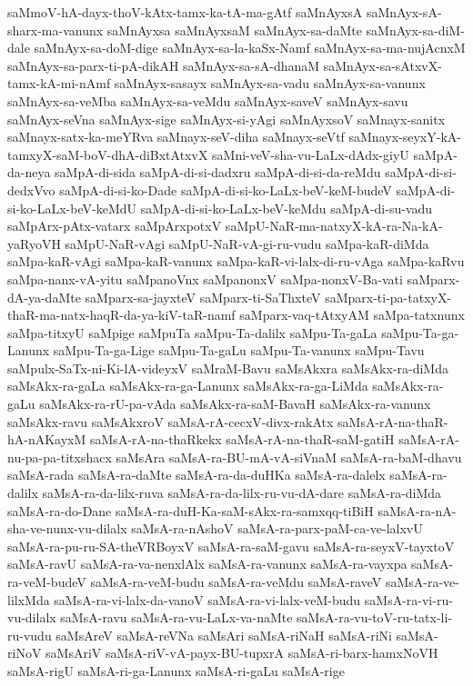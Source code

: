 {saMmoV-hA-dayx-thoV-kAtx-tamx-ka-tA-ma-gAtf
saMnAyxsA
saMnAyx-sA-sharx-ma-vanunx
saMnAyxsa
saMnAyxsaM
saMnAyx-sa-daMte
saMnAyx-sa-diM-dale
saMnAyx-sa-doM-dige
saMnAyx-sa-la-kaSx-Namf
saMnAyx-sa-ma-nujAcnxM
saMnAyx-sa-parx-ti-pA-dikAH
saMnAyx-sa-sA-dhanaM
saMnAyx-sa-sAtxvX-tamx-kA-mi-nAmf
saMnAyx-sasayx
saMnAyx-sa-vadu
saMnAyx-sa-vanunx
saMnAyx-sa-veMba
saMnAyx-sa-veMdu
saMnAyx-saveV
saMnAyx-savu
saMnAyx-seVna
saMnAyx-sige
saMnAyx-si-yAgi
saMnAyxsoV
saMnayx-sanitx
saMnayx-satx-ka-meYRva
saMnayx-seV-diha
saMnayx-seVtf
saMnayx-seyxY-kA-tamxyX-saM-boV-dhA-diBxtAtxvX
saMni-veV-sha-vu-LaLx-dAdx-giyU
saMpA-da-neya
saMpA-di-sida
saMpA-di-si-dadxru
saMpA-di-si-da-reMdu
saMpA-di-si-dedxVvo
saMpA-di-si-ko-Dade
saMpA-di-si-ko-LaLx-beV-keM-budeV
saMpA-di-si-ko-LaLx-beV-keMdU
saMpA-di-si-ko-LaLx-beV-keMdu
saMpA-di-su-vadu
saMpArx-pAtx-vatarx
saMpArxpotxV
saMpU-NaR-ma-natxyX-kA-ra-Na-kA-yaRyoVH
saMpU-NaR-vAgi
saMpU-NaR-vA-gi-ru-vudu
saMpa-kaR-diMda
saMpa-kaR-vAgi
saMpa-kaR-vanunx
saMpa-kaR-vi-lalx-di-ru-vAga
saMpa-kaRvu
saMpa-nanx-vA-yitu
saMpanoVnx
saMpanonxV
saMpa-nonxV-Ba-vati
saMparx-dA-ya-daMte
saMparx-sa-jayxteV
saMparx-ti-SaThxteV
saMparx-ti-pa-tatxyX-thaR-ma-natx-haqR-da-ya-kiV-taR-namf
saMparx-vaq-tAtxyAM
saMpa-tatxnunx
saMpa-titxyU
saMpige
saMpuTa
saMpu-Ta-dalilx
saMpu-Ta-gaLa
saMpu-Ta-ga-Lanunx
saMpu-Ta-ga-Lige
saMpu-Ta-gaLu
saMpu-Ta-vanunx
saMpu-Tavu
saMpulx-SaTx-ni-Ki-lA-videyxV
saMraM-Bavu
saMsAkxra
saMsAkx-ra-diMda
saMsAkx-ra-gaLa
saMsAkx-ra-ga-Lanunx
saMsAkx-ra-ga-LiMda
saMsAkx-ra-gaLu
saMsAkx-ra-rU-pa-vAda
saMsAkx-ra-saM-BavaH
saMsAkx-ra-vanunx
saMsAkx-ravu
saMsAkxroV
saMsA-rA-cecxV-divx-rakAtx
saMsA-rA-na-thaR-hA-nAKayxM
saMsA-rA-na-thaRkekx
saMsA-rA-na-thaR-saM-gatiH
saMsA-rA-nu-pa-pa-titxshacx
saMsAra
saMsA-ra-BU-mA-vA-siVnaM
saMsA-ra-baM-dhavu
saMsA-rada
saMsA-ra-daMte
saMsA-ra-da-duHKa
saMsA-ra-dalelx
saMsA-ra-dalilx
saMsA-ra-da-lilx-ruva
saMsA-ra-da-lilx-ru-vu-dA-dare
saMsA-ra-diMda
saMsA-ra-do-Dane
saMsA-ra-duH-Ka-saM-sAkx-ra-samxqq-tiBiH
saMsA-ra-nA-sha-ve-nunx-vu-dilalx
saMsA-ra-nAshoV
saMsA-ra-parx-paM-ca-ve-lalxvU
saMsA-ra-pu-ru-SA-theVRBoyxV
saMsA-ra-saM-gavu
saMsA-ra-seyxV-tayxtoV
saMsA-ravU
saMsA-ra-va-nenxlAlx
saMsA-ra-vanunx
saMsA-ra-vayxpa
saMsA-ra-veM-budeV
saMsA-ra-veM-budu
saMsA-ra-veMdu
saMsA-raveV
saMsA-ra-ve-lilxMda
saMsA-ra-vi-lalx-da-vanoV
saMsA-ra-vi-lalx-veM-budu
saMsA-ra-vi-ru-vu-dilalx
saMsA-ravu
saMsA-ra-vu-LaLx-va-naMte
saMsA-ra-vu-toV-ru-tatx-li-ru-vudu
saMsAreV
saMsA-reVNa
saMsAri
saMsA-riNaH
saMsA-riNi
saMsA-riNoV
saMsAriV
saMsA-riV-vA-payx-BU-tupxrA
saMsA-ri-barx-hamxNoVH
saMsA-rigU
saMsA-ri-ga-Lanunx
saMsA-ri-gaLu
saMsA-rige
}
